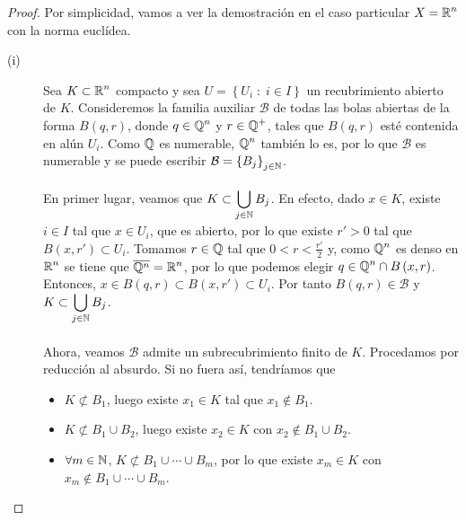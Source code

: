 \begin{proof}
Por simplicidad, vamos a ver la demostración en el caso particular $\displaystyle X = \mathbb{R}^{n} $ con la norma euclídea. 
\begin{description}
	\item[(i)] Sea $\displaystyle K \subset \mathbb{R}^{n} $ compacto y sea $\displaystyle U = \left\{ U_{i} \; : \; i \in I\right\}  $ un recubrimiento abierto de $\displaystyle K $. Consideremos la familia auxiliar $\displaystyle \mathcal{B}  $ de todas las bolas abiertas de la forma $\displaystyle B\left(q,r\right) $, donde $\displaystyle q \in \mathbb{Q}^{n} $ y $\displaystyle r \in \mathbb{Q}^{+} $, tales que $\displaystyle B\left(q,r\right) $ esté contenida en alún $\displaystyle U_{i} $. Como $\displaystyle \mathbb{Q} $ es numerable, $\displaystyle \mathbb{Q}^{n} $ también lo es, por lo que $\displaystyle \mathcal{B} $ es numerable y se puede escribir $\displaystyle \mathcal{B} = \left\{ B_{j}\right\}_{j \in \mathbb{N}} $. \\ \\
En primer lugar, veamos que $\displaystyle K \subset \bigcup_{j \in \mathbb{N}}B_{j} $. En efecto, dado $\displaystyle x \in K $, existe $\displaystyle i \in I $ tal que $\displaystyle x \in U_{i} $, que es abierto, por lo que existe $\displaystyle r' > 0 $ tal que $\displaystyle B\left(x,r'\right)\subset U_{i} $. Tomamos $\displaystyle r \in \mathbb{Q} $ tal que $\displaystyle 0 < r < \frac{r'}{2} $ y, como $\displaystyle \mathbb{Q}^{n} $ es denso en $\displaystyle \mathbb{R}^{n} $ se tiene que $\displaystyle \overline{\mathbb{Q}^{n}} = \mathbb{R}^{n} $, por lo que podemos elegir $\displaystyle q \in \mathbb{Q}^{n} \cap B\left(x,r\right) $. 
		Entonces, $\displaystyle x \in B\left(q,r\right) \subset B\left(x,r'\right)\subset U_{i} $. Por tanto $\displaystyle B\left(q,r\right) \in \mathcal{B} $ y $\displaystyle K \subset \bigcup_{j \in \mathbb{N}}B_{j} $. \\ \\
		Ahora, veamos $\displaystyle \mathcal{B} $ admite un subrecubrimiento finito de $\displaystyle K $. Procedamos por reducción al absurdo. Si no fuera así, tendríamos que
		\begin{itemize}
		\item $\displaystyle K \not\subset B_{1} $, luego existe $\displaystyle x_{1} \in K $ tal que $\displaystyle x_{1} \not\in B_{1} $.
		\item $\displaystyle K \not\subset B_{1} \cup B_{2} $, luego existe $\displaystyle x_{2} \in K $ con $\displaystyle x_{2} \not\in B_{1} \cup B_{2} $.
		\item $\displaystyle \forall m \in \mathbb{N} $, $\displaystyle K \not \subset B_{1} \cup \cdots \cup B_{m} $, por lo que existe $\displaystyle x_{m} \in K $ con $\displaystyle x_{m} \not\in B_{1} \cup \cdots \cup B_{m} $. 

\end{itemize}
\end{description}
\end{proof}
